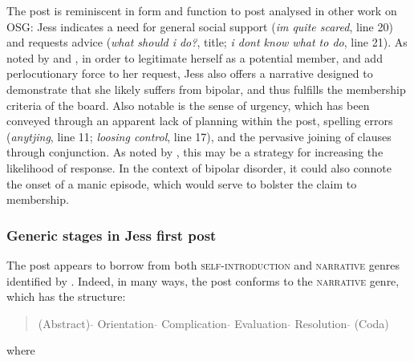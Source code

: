 \documentclass{article}
\begin{document}
The post is reminiscent in form and function to post analysed in other work on OSG: Jess indicates a need for general social support (\emph{im quite scared}, line 20) and requests advice (\emph{what should i do?}, title; \emph{i dont know what to do}, line 21). As noted by \textcite{smithson_developing_2012} and \textcite{varga2014grieving}, in order to legitimate herself as a potential member, and add perlocutionary force to her request, Jess also offers a narrative designed to demonstrate that she likely suffers from bipolar, and thus fulfills the membership criteria of the board. Also notable is the sense of urgency, which has been conveyed through an apparent lack of planning within the post, spelling errors (\emph{anytjing}, line 11; \emph{loosing control}, line 17), and the pervasive joining of clauses through conjunction. As noted by \textcite{horne_doing_2009}, this may be a strategy for increasing the likelihood of response. In the context of bipolar disorder, it could also connote the onset of a manic episode, which would serve to bolster the claim to membership.

\subsubsection{Generic stages in Jess first post}

The post appears to borrow from both \textsc{self-introduction} and \textsc{narrative} genres identified by \textcite{labov_narrative_1997}. Indeed, in many ways, the post conforms to the \textsc{narrative} genre, which has the structure:

\begin{quote}
(Abstract) $\hat{}$ Orientation $\hat{}$ Complication $\hat{}$ Evaluation $\hat{}$ Resolution $\hat{}$ (Coda)
\end{quote}

\noindent where
\end{document}

